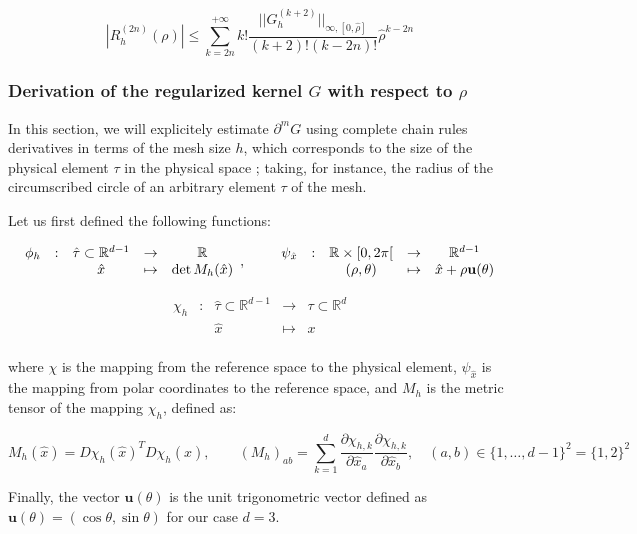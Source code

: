 ﻿\documentclass{article}
\begin{document}
\begin{equation}
  |R_h^{(2n)}(\rho)| \leq \sum_{k=2n}^{+\infty}k!\frac{||G_h^{(k+2)}||_{\infty, [0, \hat\rho]}}{(k+2)!(k-2n)!}\hat\rho^{k-2n}
\end{equation}

\subsubsection{Derivation of the regularized kernel $G$ with respect to $\rho$}

In this section, we will explicitely estimate $\partial^mG$ using complete chain rules derivatives in terms of the mesh size $h$, which corresponds to the size of the physical element $\tau$ in the physical space ; taking, for instance, the radius of the circumscribed circle of an arbitrary element $\tau$ of the mesh.

\begin{definition} Let us first defined the following functions:
  
$$\begin{array}{ccccc}
\phi_h & : & \hat\tau\subset\mathbb R^{d-1} & \to & \mathbb R \\
 & & \hat x & \mapsto & \det M_h(\hat x) \\
\end{array}, \qquad \begin{array}{ccccc}
\psi_{\hat x} & : & \mathbb R\times [0, 2\pi[ & \to & \mathbb R^{d-1} \\
 & & (\rho, \theta) & \mapsto &\hat x + \rho \mathbf u(\theta) \\
 \end{array}\\$$

$$\begin{array}{ccccc}
\chi_h & : & \hat\tau\subset\mathbb R^{d-1} & \to & \tau\subset\mathbb R^d\\
 & & \hat x & \mapsto & x \\
\end{array}$$

where $\chi$ is the mapping from the reference space to the physical element, $\psi_{\hat x}$ is the mapping from polar coordinates to the reference space, and $M_h$ is the metric tensor of the mapping $\chi_h$, defined as:

\begin{equation}
  M_h(\hat x) = D\chi_h(\hat x)^TD\chi_h(\hat x), \qquad (M_h)_{ab} = \sum_{k=1}^{d}\frac{\partial\chi_{h,k}}{\partial \hat x_a}\frac{\partial\chi_{h,k}}{\partial \hat x_b}, \quad (a, b)\in \{1, \dots, d-1\}^2 = \{1, 2\}^2
\end{equation}

Finally, the vector $\mathbf u(\theta)$ is the unit trigonometric vector defined as $\mathbf u(\theta) = (\cos\theta, \sin\theta)$ for our case $d = 3$. 
\end{definition}
\end{document}
